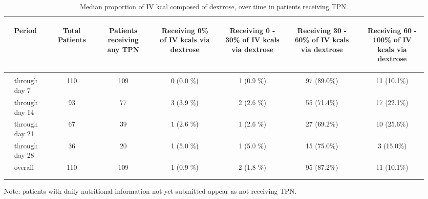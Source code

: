 \documentclass[dvips,10pt]{article}
\begin{document}
\begin{table}[t]
\caption
{ Median proportion of IV kcal composed of dextrose, over time in patients receiving TPN. }
\begin{center}
\begin{tabular}{ @{}l@{}
@{}l@{}@{}p{1.5em}@{}@{}c@{}@{}p{1.5em}@{}@{}c@{}@{}p{1.5em}@{}@{}c@{}@{}p{1.5em}@{}@{}c@{}@{}p{1.5em}@{}@{}c@{}@{}p{1.5em}@{}@{}c@{}
}
\hline

& \parbox{6em}{\begin{center}Period\end{center}} && \parbox{6em}{\begin{center}Total Patients\end{center}} && \parbox{6em}{\begin{center}Patients receiving any TPN\end{center}} && \parbox{6em}{\begin{center}Receiving 0\% of IV kcals via dextrose\end{center}} && \parbox{6em}{\begin{center}Receiving 0 - 30\% of IV kcals via dextrose\end{center}} && \parbox{6em}{\begin{center}Receiving 30 - 60\% of IV kcals via dextrose\end{center}} && \parbox{6em}{\begin{center}Receiving 60 - 100\% of IV kcals via dextrose\end{center}} \\

\hline

\\
& through day 7 && 110 && 109 && 0 (0.0 \%) && 1 (0.9 \%) && 97 (89.0\%) && 11 (10.1\%) \\
& through day 14 && 93 && 77 && 3 (3.9 \%) && 2 (2.6 \%) && 55 (71.4\%) && 17 (22.1\%) \\
& through day 21 && 67 && 39 && 1 (2.6 \%) && 1 (2.6 \%) && 27 (69.2\%) && 10 (25.6\%) \\
& through day 28 && 36 && 20 && 1 (5.0 \%) && 1 (5.0 \%) && 15 (75.0\%) && 3 (15.0\%) \\
& overall && 110 && 109 && 1 (0.9 \%) && 2 (1.8 \%) && 95 (87.2\%) && 11 (10.1\%) \\
\\
\hline \\

\end{tabular}


\parbox{ 5in }{  Note: patients with daily nutritional information not yet submitted appear as not receiving TPN. } \\
 \vspace{1em}\end{center}
 \end{table}
\end{document}
